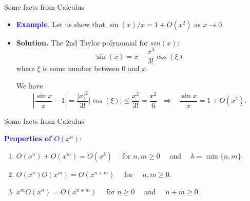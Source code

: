 \documentclass{beamer}
\begin{document}


\begin{frame}{\small Some facts from Calculus}


\begin{itemize}[<+->]

\item
\textcolor{blue}{\textbf{Example}}. Let us show that $\sin(x)/x=1+O(x^2)$ as $x\to 0$.


\vskip 3mm

\item \textbf{Solution.}
The 2nd Taylor polynomial for $sin(x)$:
\[
\sin(x)=x-\frac{x^{3}}{3!}\cos(\xi)
\]
where $\xi$ is some number between 0 and $x$.

\vskip 3mm
We have
\[
\left\vert \frac{\sin x}{x} -1 \right\vert = \frac{\vert x
\vert^{2}}{3!}\vert \cos(\xi)\vert \leq \frac{x^{2}}{3!}=\frac{x^{2}}{6} \ \ \
\Rightarrow \ \ \ \ \frac{\sin x}{x}=1+O(x^{2}).
\]

\end{itemize}


\end{frame}



\begin{frame}{\small Some facts from Calculus}

\textcolor{blue}{\textbf{Properties of $O(x^n)$}}:

\begin{enumerate}[<+->]
\item{} $O(x^n)+O(x^m)=O(x^k)$ \ \ for $n,m\geq 0$ \ \ and \ \ $k=\min\{n,m\}$.

\vskip 3mm
\item{} $O(x^n)O(x^m)=O(x^{n+m})$ \ \ for \ \ $n,m\geq 0$.

\vskip 3mm
\item{} $x^m O(x^n)=O(x^{n+m})$ \ \ for $n\geq 0$ \ \ and \ \ $n+m\geq 0$.
\end{enumerate}



\end{frame}
\end{document}
